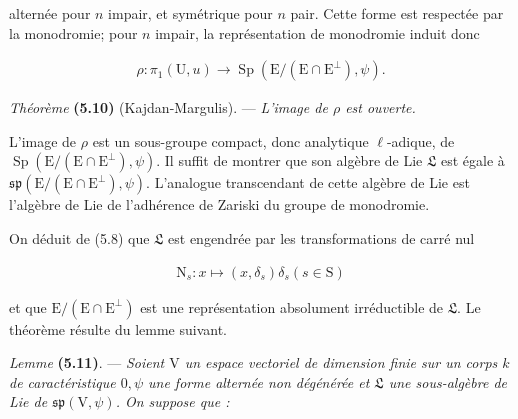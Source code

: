 \documentclass[10pt,leqno]{article}
\begin{document}
\noindent alternée pour \(n\) impair, et symétrique pour \(n\) pair. Cette forme est respectée par la monodromie; pour \(n\) impair, la représentation de monodromie induit donc\par

\begin{equation*}\begin{gathered}\rho  : \pi _{1}(\mathrm{U},u) \longrightarrow  \operatorname{Sp}(\mathrm{E}/(\mathrm{E}\cap \mathrm{E}^{\perp }),\psi ).\end{gathered}\end{equation*}

\noindent \emph{Théorème} \textbf{(5.10)} (Kajdan-Margulis). — {\itshape L’image de \(\rho \) est ouverte.}\par

\noindent L’image de \(\rho \) est un sous-groupe compact, donc analytique \(\ell \)-adique, de \(\operatorname{Sp}(\mathrm{E}/(\mathrm{E}\cap \mathrm{E}^{\perp }),\psi )\). Il suffit de montrer que son algèbre de Lie \(\mathfrak{L} \) est égale à \(\mathfrak{sp}(\mathrm{E}/(\mathrm{E}\cap \mathrm{E}^{\perp }),\psi )\). L’analogue transcendant de cette algèbre de Lie est l’algèbre de Lie de l’adhérence de Zariski du groupe de monodromie.\par

\noindent On déduit de (5.8) que \(\mathfrak{L} \) est engendrée par les transformations de carré nul\par

\begin{equation*}\begin{gathered}\mathrm{N}_{s} : x \longmapsto  (x,\delta _{s})\delta _{s}    (s\in \mathrm{S})\end{gathered}\end{equation*}

\noindent et que \(\mathrm{E}/(\mathrm{E}\cap \mathrm{E}^{\perp })\) est une représentation absolument irréductible de \(\mathfrak{L} \). Le théorème résulte du lemme suivant.\par

\noindent \emph{Lemme} \textbf{(5.11)}. — {\itshape Soient \(\mathrm{V}\) un espace vectoriel de dimension finie sur un corps \(k\) de caractéristique \(0, \psi \) une forme alternée non dégénérée et \(\mathfrak{L} \) une sous-algèbre de Lie de \(\mathfrak{sp}(\mathrm{V},\psi )\). On suppose que :}\par

\par
\end{document}
